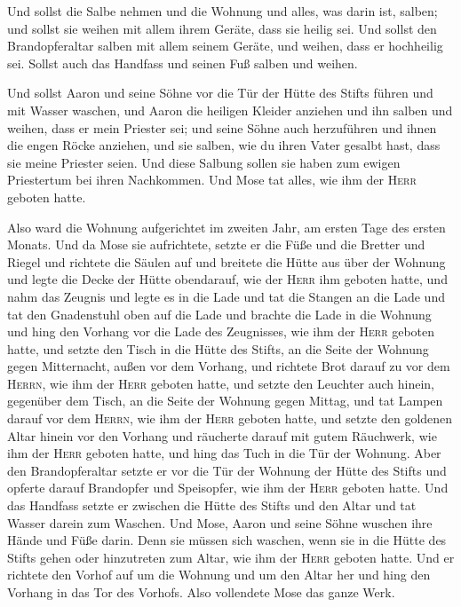  Und sollst die Salbe nehmen und die Wohnung und alles,
was darin ist, salben; und sollst sie weihen mit allem ihrem Geräte,
dass sie heilig sei.  Und sollst den Brandopferaltar
salben mit allem seinem Geräte, und weihen, dass er hochheilig sei.
 Sollst auch das Handfass und seinen Fuß salben und
weihen.

 Und sollst Aaron und seine Söhne vor die Tür der Hütte
des Stifts führen und mit Wasser waschen,  und Aaron die
heiligen Kleider anziehen und ihn salben und weihen, dass er mein
Priester sei;  und seine Söhne auch herzuführen und ihnen
die engen Röcke anziehen,  und sie salben, wie du ihren
Vater gesalbt hast, dass sie meine Priester seien. Und diese Salbung
sollen sie haben zum ewigen Priestertum bei ihren Nachkommen.
 Und Mose tat alles, wie ihm der \textsc{Herr} geboten
hatte.

 Also ward die Wohnung aufgerichtet im zweiten Jahr, am
ersten Tage des ersten Monats.  Und da Mose sie
aufrichtete, setzte er die Füße und die Bretter und Riegel und richtete
die Säulen auf  und breitete die Hütte aus über der
Wohnung und legte die Decke der Hütte obendarauf, wie der \textsc{Herr}
ihm geboten hatte,  und nahm das Zeugnis und legte es in
die Lade und tat die Stangen an die Lade und tat den Gnadenstuhl oben
auf die Lade  und brachte die Lade in die Wohnung und
hing den Vorhang vor die Lade des Zeugnisses, wie ihm der \textsc{Herr}
geboten hatte,  und setzte den Tisch in die Hütte des
Stifts, an die Seite der Wohnung gegen Mitternacht, außen vor dem
Vorhang,  und richtete Brot darauf zu vor dem
\textsc{Herrn}, wie ihm der \textsc{Herr} geboten hatte, 
und setzte den Leuchter auch hinein, gegenüber dem Tisch, an die Seite
der Wohnung gegen Mittag,  und tat Lampen darauf vor dem
\textsc{Herrn}, wie ihm der \textsc{Herr} geboten hatte, 
und setzte den goldenen Altar hinein vor den Vorhang  und
räucherte darauf mit gutem Räuchwerk, wie ihm der \textsc{Herr} geboten
hatte,  und hing das Tuch in die Tür der Wohnung.
 Aber den Brandopferaltar setzte er vor die Tür der
Wohnung der Hütte des Stifts und opferte darauf Brandopfer und
Speisopfer, wie ihm der \textsc{Herr} geboten hatte.  Und
das Handfass setzte er zwischen die Hütte des Stifts und den Altar und
tat Wasser darein zum Waschen.  Und Mose, Aaron und seine
Söhne wuschen ihre Hände und Füße darin.  Denn sie müssen
sich waschen, wenn sie in die Hütte des Stifts gehen oder hinzutreten
zum Altar, wie ihm der \textsc{Herr} geboten hatte.  Und
er richtete den Vorhof auf um die Wohnung und um den Altar her und hing
den Vorhang in das Tor des Vorhofs. Also vollendete Mose das ganze Werk.

